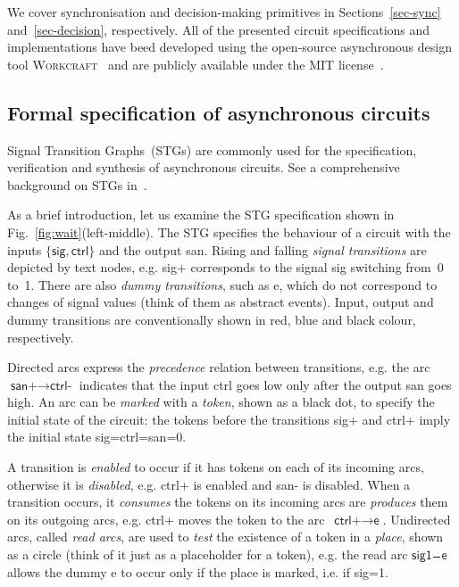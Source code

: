 \documentclass[conference]{IEEEtran}
\begin{document}
We cover synchronisation and
decision-making primitives in Sections~\ref{sec-sync} and~\ref{sec-decision}, respectively.
All of the presented circuit specifications and implementations have beed developed using
the open-source asynchronous design tool \textsc{Workcraft}~\cite{Workcraft_website} and are
publicly available under the MIT license~\cite{Arbitration_primitives_github}.


\subsection*{Formal specification of asynchronous circuits}\label{sec-stg}

Signal Transition Graphs~(STGs) are commonly used for the specification,
verification and synthesis of asynchronous circuits. See a comprehensive
background on STGs in~\cite{2002_cortadella_book}.

As a brief introduction, let us examine the STG specification shown in
Fig.~\ref{fig:wait}(left-middle). The STG specifies the behaviour
of a circuit with the inputs $\{\textsf{sig}, \textsf{ctrl}\}$
and the output \textsf{san}. Rising and falling \emph{signal transitions} are depicted by text
nodes, e.g. \textsf{sig+} corresponds to the signal \textsf{sig} switching from~0 to~1.
There are also \emph{dummy transitions}, such as \textsf{e}, which do not correspond to
changes of signal values (think of them as abstract events).
Input, output and dummy transitions are conventionally shown in red, blue and black
colour, respectively.

Directed arcs express the \emph{precedence} relation
between transitions, e.g. the arc $\textsf{san+} \longrightarrow \textsf{ctrl-}$ indicates
that the input \textsf{ctrl} goes low only after the output \textsf{san} goes high.
An arc can be \emph{marked} with a \emph{token}, shown as a black dot, to specify
the initial state of the circuit: the tokens before the transitions \textsf{sig+} and
\textsf{ctrl+} imply the initial state \textsf{sig=ctrl=san=0}.

A transition is \emph{enabled} to occur if it has tokens on each of its incoming
arcs, otherwise it is \emph{disabled}, e.g. \textsf{ctrl+} is enabled and \textsf{san-}
is disabled. When a transition occurs, it \emph{consumes} the tokens on its incoming arcs
are \emph{produces} them on its outgoing arcs, e.g. \textsf{ctrl+} moves the token to the
arc~$\textsf{ctrl+} \longrightarrow \textsf{e}$. Undirected arcs, called
\emph{read arcs}, are used to \emph{test} the existence of a token in a \emph{place}, shown as
a circle (think of it just as a placeholder for a token), e.g. the read arc
$\textsf{sig1} \frac{~~~~}{~} \textsf{e}$ allows the dummy \textsf{e} to occur only if
the place is marked, i.e. if \textsf{sig=1}.
\end{document}
